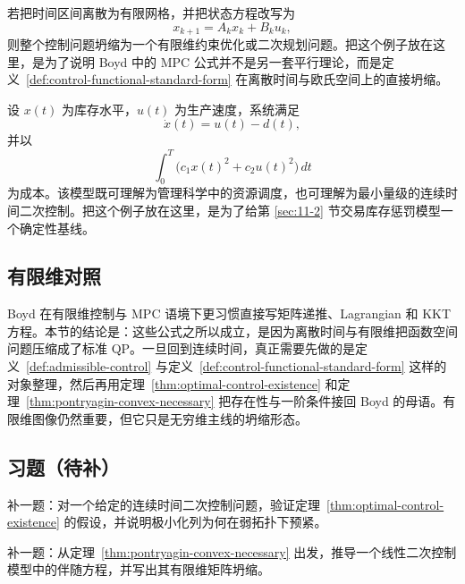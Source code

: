 \begin{example}
若把时间区间离散为有限网格，并把状态方程改写为
\[
x_{k+1}=A_kx_k+B_ku_k,
\]
则整个控制问题坍缩为一个有限维约束优化或二次规划问题。把这个例子放在这里，是为了说明 Boyd 中的 MPC 公式并不是另一套平行理论，而是定义~\ref{def:control-functional-standard-form} 在离散时间与欧氏空间上的直接坍缩。
\end{example}

\begin{example}[库存--产能平滑控制]
设 $x(t)$ 为库存水平，$u(t)$ 为生产速度，系统满足
\[
\dot x(t)=u(t)-d(t),
\]
并以
\[
\int_0^T \bigl(c_1x(t)^2+c_2u(t)^2\bigr)\,dt
\]
为成本。该模型既可理解为管理科学中的资源调度，也可理解为最小量级的连续时间二次控制。把这个例子放在这里，是为了给第 \ref{sec:11-2} 节交易库存惩罚模型一个确定性基线。
\end{example}

\subsection*{有限维对照}

Boyd 在有限维控制与 MPC 语境下更习惯直接写矩阵递推、Lagrangian 和 KKT 方程。本节的结论是：这些公式之所以成立，是因为离散时间与有限维把函数空间问题压缩成了标准 QP。一旦回到连续时间，真正需要先做的是定义~\ref{def:admissible-control} 与定义~\ref{def:control-functional-standard-form} 这样的对象整理，然后再用定理~\ref{thm:optimal-control-existence} 和定理~\ref{thm:pontryagin-convex-necessary} 把存在性与一阶条件接回 Boyd 的母语。有限维图像仍然重要，但它只是无穷维主线的坍缩形态。

\subsection*{习题（待补）}

\begin{exercise}[直接法存在性占位]
补一题：对一个给定的连续时间二次控制问题，验证定理~\ref{thm:optimal-control-existence} 的假设，并说明极小化列为何在弱拓扑下预紧。
\end{exercise}

\begin{exercise}[伴随系统桥接题占位]
补一题：从定理~\ref{thm:pontryagin-convex-necessary} 出发，推导一个线性二次控制模型中的伴随方程，并写出其有限维矩阵坍缩。
\end{exercise}
